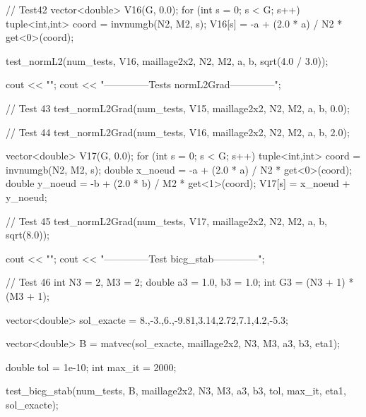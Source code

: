 \begin{codeblock}
{    // Test42
    vector<double> V16(G, 0.0);
    for (int s = 0; s < G; s++) {
        tuple<int,int> coord = invnumgb(N2, M2, s);
        V16[s] = -a + (2.0 * a) / N2 * get<0>(coord);
    }

    test_normL2(num_tests, V16, maillage2x2, N2, M2, a, b, sqrt(4.0 / 3.0));


    cout << "\n\n\n";
    cout << "--------------Tests normL2Grad--------------\n";


    // Test 43
    test_normL2Grad(num_tests, V15, maillage2x2, N2, M2, a, b, 0.0);

    // Test 44
    test_normL2Grad(num_tests, V16, maillage2x2, N2, M2, a, b, 2.0);

    vector<double> V17(G, 0.0);
    for (int s = 0; s < G; s++) {
        tuple<int,int> coord = invnumgb(N2, M2, s);
        double x_noeud = -a + (2.0 * a) / N2 * get<0>(coord);
        double y_noeud = -b + (2.0 * b) / M2 * get<1>(coord);
        V17[s] = x_noeud + y_noeud;
    }

    // Test 45
    test_normL2Grad(num_tests, V17, maillage2x2, N2, M2, a, b, sqrt(8.0));



    cout << "\n\n\n";
    cout << "--------------Test bicg_stab--------------\n";


    // Test 46
    int N3 = 2, M3 = 2;
    double a3 = 1.0, b3 = 1.0;
    int G3 = (N3 + 1) * (M3 + 1);

    vector<double> sol_exacte = {8.,-3.,6.,-9.81,3.14,2.72,7.1,4.2,-5.3};


    vector<double> B = matvec(sol_exacte, maillage2x2, N3, M3, a3, b3, eta1);

    double tol = 1e-10;
    int max_it = 2000;


    test_bicg_stab(num_tests, B, maillage2x2, N3, M3, a3, b3, tol, max_it, eta1, sol_exacte);

}





\end{codeblock}